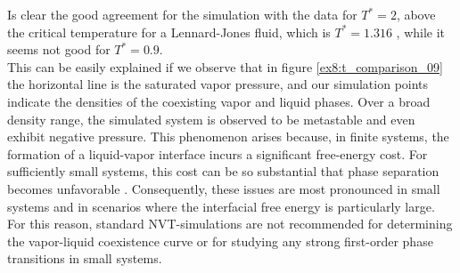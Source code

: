 Is clear the good agreement for the simulation with the data for $T^*=2$, above the critical temperature for a Lennard-Jones fluid, which is $T^* = 1.316$ \cite{johnson1993}, while it seems not good for $T^*=0.9$. \\
This can be easily explained if we observe that in figure \ref{ex8:t_comparison_09} the horizontal line is the saturated vapor pressure, and our simulation points indicate the densities of the coexisting vapor and liquid phases. Over a broad density range, the simulated system is observed to be metastable and even exhibit negative pressure. This phenomenon arises because, in finite systems, the formation of a liquid-vapor interface incurs a significant free-energy cost. For sufficiently small systems, this cost can be so substantial that phase separation becomes unfavorable \cite{salsburg1962}. Consequently, these issues are most pronounced in small systems and in scenarios where the interfacial free energy is particularly large. For this reason, standard NVT-simulations are not recommended for determining the vapor-liquid coexistence curve or for studying any strong first-order phase transitions in small systems.
